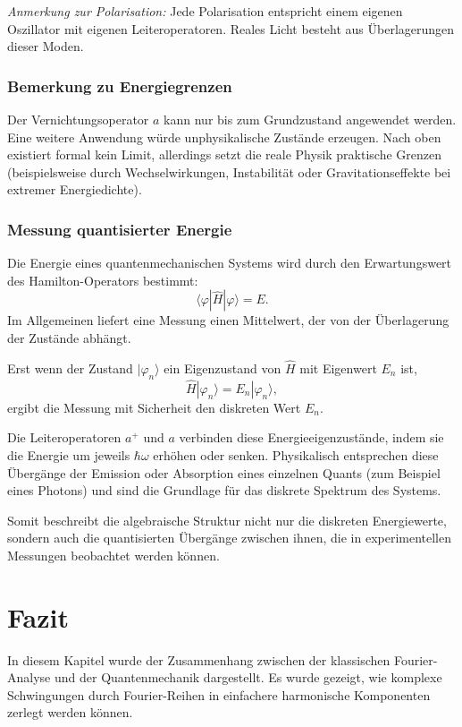 			\textit{Anmerkung zur Polarisation:}
			Jede Polarisation entspricht einem eigenen Oszillator mit eigenen Leiteroperatoren.
			Reales Licht besteht aus Überlagerungen dieser Moden.

		\subsubsection{Bemerkung zu Energiegrenzen\label{fourier:subsubsection:BemerkungBegrenztheitDerEnergie}}
			Der Vernichtungsoperator $a$ kann nur bis zum Grundzustand angewendet werden.
			Eine weitere Anwendung würde unphysikalische Zustände erzeugen.
			Nach oben existiert formal kein Limit, allerdings setzt die reale Physik praktische Grenzen
			(beispielsweise durch Wechselwirkungen, Instabilität oder Gravitationseffekte bei extremer Energiedichte).

		\subsubsection{Messung quantisierter Energie\label{fourier:subsubsection:MessungQuantisierterEnergie}}
			Die Energie eines quantenmechanischen Systems wird durch den Erwartungswert des Hamilton-Operators bestimmt:
			\[
				\langle \varphi | \hat{H} | \varphi \rangle = E.
			\]
			Im Allgemeinen liefert eine Messung einen Mittelwert, der von der Überlagerung der Zustände abhängt.

			Erst wenn der Zustand $|\varphi_n\rangle$ ein Eigenzustand von $\hat{H}$ mit Eigenwert $E_n$ ist,
			\[
				\hat{H}|\varphi_n\rangle = E_n |\varphi_n\rangle,
			\]
			ergibt die Messung mit Sicherheit den diskreten Wert $E_n$.

			Die Leiteroperatoren $a^+$ und $a$ verbinden diese Energieeigenzustände, indem sie die Energie um jeweils $\hbar\omega$ erhöhen oder senken. 
			Physikalisch entsprechen diese Übergänge der Emission oder Absorption eines einzelnen Quants (zum Beispiel eines Photons) und sind die Grundlage für das diskrete Spektrum des Systems.

			Somit beschreibt die algebraische Struktur nicht nur die diskreten Energiewerte, sondern auch die quantisierten Übergänge zwischen ihnen, die in experimentellen Messungen beobachtet werden können.

\section{Fazit\label{fourier:section:fazit}}
	In diesem Kapitel wurde der Zusammenhang zwischen der klassischen Fourier-Analyse und der Quantenmechanik dargestellt.
	Es wurde gezeigt, wie komplexe Schwingungen durch Fourier-Reihen in einfachere harmonische Komponenten zerlegt werden können.

